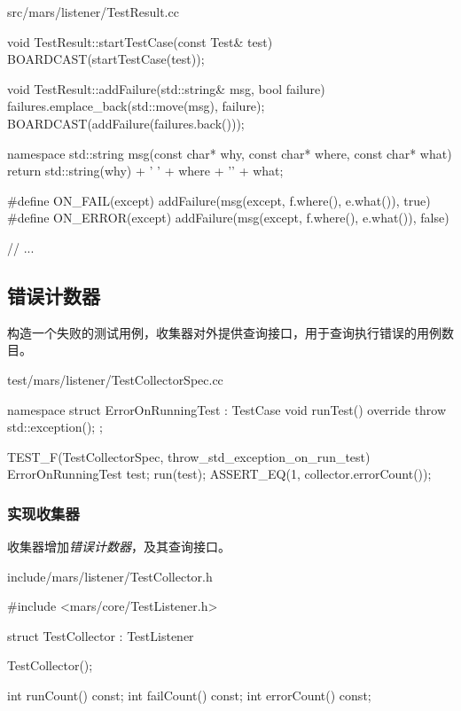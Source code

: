 \begin{content}
\begin{nodiff}{src/mars/listener/TestResult.cc}
\begin{c++}
void TestResult::startTestCase(const Test& test) {
  BOARDCAST(startTestCase(test));
}

void TestResult::addFailure(std::string& msg, bool failure) {
  failures.emplace_back(std::move(msg), failure);
  BOARDCAST(addFailure(failures.back()));
}

namespace {
  std::string msg(const char* why, const char* where, const char* what) {
    return std::string(why) + ' ' + where + '\n' + what;
  }
}

#define ON_FAIL(except)  addFailure(msg(except, f.where(), e.what()), true)
#define ON_ERROR(except) addFailure(msg(except, f.where(), e.what()), false)

// ...
 \end{c++}
\end{nodiff}

\subsection{错误计数器}

构造一个失败的测试用例，收集器对外提供查询接口，用于查询执行错误的用例数目。

\begin{nodiff}{test/mars/listener/TestCollectorSpec.cc}
 \begin{c++}
namespace {
  struct ErrorOnRunningTest : TestCase {
   void runTest() override {
      throw std::exception();
    }
  };
}

TEST_F(TestCollectorSpec, throw_std_exception_on_run_test) {
  ErrorOnRunningTest test;
  run(test);
  ASSERT_EQ(1, collector.errorCount());
}
 \end{c++}
\end{nodiff}

\subsubsection{实现收集器}

收集器增加\emph{错误计数器}，及其查询接口。

\begin{nodiff}{include/mars/listener/TestCollector.h}
 \begin{c++}
#include <mars/core/TestListener.h>

struct TestCollector : TestListener {
  TestCollector();

  int runCount() const;
  int failCount() const;
  int errorCount() const;

}
\end{c++}
\end{nodiff}
\end{content}
